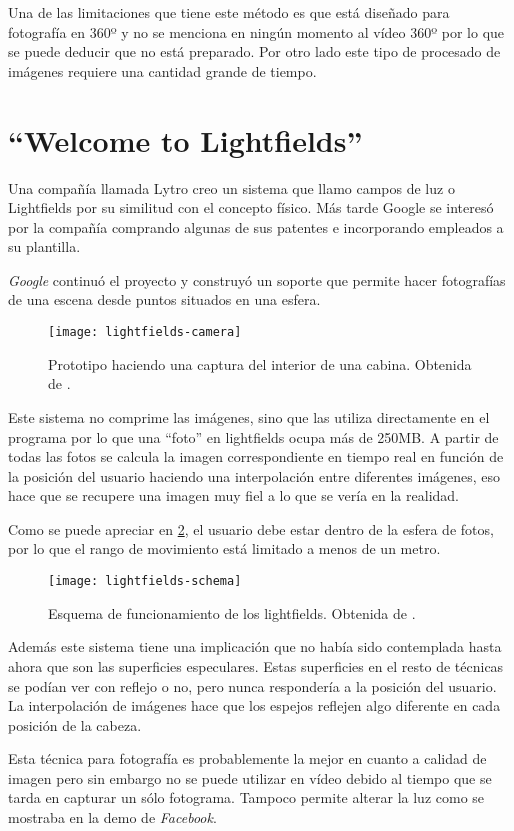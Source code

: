 Una de las limitaciones que tiene este método es que está diseñado para fotografía en 360º y no se menciona en ningún momento al vídeo 360º por lo que se puede deducir que no está preparado. Por otro lado este tipo de procesado de imágenes requiere una cantidad grande de tiempo.

\section{``Welcome to Lightfields''}
Una compañía llamada Lytro creo un sistema que llamo campos de luz o Lightfields \cite{LytroLightfields} por su similitud con el concepto físico. Más tarde Google se interesó por la compañía comprando algunas de sus patentes e incorporando empleados a su plantilla.

\textit{Google} continuó el proyecto \cite{GoogleLightfields} y construyó un soporte que permite hacer fotografías de una escena desde puntos situados en una esfera.

\begin{figure}[H]
  \centering
	\texttt{[image: lightfields-camera]}
  \caption{Prototipo haciendo una captura del interior de una cabina. Obtenida de \cite{GoogleLightfields}.}
  \label{fig:lightfields-camera}
\end{figure}
\FloatBarrier

Este sistema no comprime las imágenes, sino que las utiliza directamente en el programa por lo que una ``foto'' en lightfields ocupa más de 250MB. A partir de todas las fotos se calcula la imagen correspondiente en tiempo real en función de la posición del usuario haciendo una interpolación entre diferentes imágenes, eso hace que se recupere una imagen muy fiel a lo que se vería en la realidad.

Como se puede apreciar en \ref{fig:lightfields-schema}, el usuario debe estar dentro de la esfera de fotos, por lo que el rango de movimiento está limitado a menos de un metro.

\begin{figure}[H]
  \centering
	\texttt{[image: lightfields-schema]}
  \caption{Esquema de funcionamiento de los lightfields. Obtenida de \cite{GoogleLightfields}.}
  \label{fig:lightfields-schema}
\end{figure}
\FloatBarrier

Además este sistema tiene una implicación que no había sido contemplada hasta ahora que son las superficies especulares. Estas superficies en el resto de técnicas se podían ver con reflejo o no, pero nunca respondería a la posición del usuario. La interpolación de imágenes hace que los espejos reflejen algo diferente en cada posición de la cabeza.

Esta técnica para fotografía es probablemente la mejor en cuanto a calidad de imagen pero sin embargo no se puede utilizar en vídeo debido al tiempo que se tarda en capturar un sólo fotograma. Tampoco permite alterar la luz como se mostraba en la demo de \textit{Facebook}.











